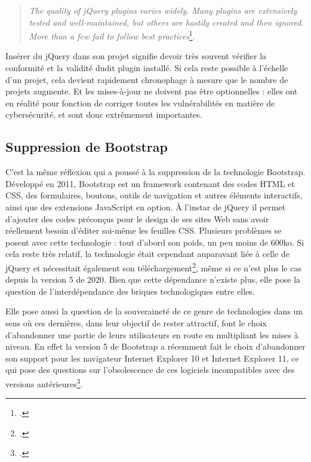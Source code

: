\documentclass[a4paper,12pt,twoside]{book}
\begin{document}
\begin{otherlanguage}{english}
\begin{quote}
    \textit{The quality of jQuery plugins varies widely. Many plugins are extensively tested and well-maintained, but others are hastily created and then ignored. More than a few fail to follow best practices}\footcite{jquery}.
\end{quote}
\end{otherlanguage}

Insérer du jQuery dans son projet signifie devoir très souvent vérifier la conformité et la validité dudit plugin installé. Si cela reste possible à l'échelle d'un projet, cela devient rapidement chronophage à mesure que le nombre de projets augmente. Et les mises-à-jour ne doivent pas être optionnelles : elles ont en réalité pour fonction de corriger toutes les vulnérabilités en matière de cybersécurité, et sont donc extrêmement importantes.

\subsection{Suppression de Bootstrap}
C'est la même réflexion qui a poussé à la suppression de la technologie Bootstrap. Développé en 2011, Bootstrap est un framework contenant des codes \acrshort{HTML} et CSS, des formulaires, boutons, outils de navigation et autres éléments interactifs, ainsi que des extensions JavaScript en option. À l'instar de jQuery il permet d'ajouter des codes préconçus pour le design de ses sites Web sans avoir réellement besoin d'éditer soi-même les feuilles CSS. Plusieurs problèmes se posent avec cette technologie : tout d'abord son poids, un peu moins de 600ko. Si cela reste très relatif, la technologie était cependant auparavant liée à celle de jQuery et nécessitait également son téléchargement\footcite{why-bootstrap}, même si ce n'est plus le cas depuis la version 5 de 2020. Bien que cette dépendance n'existe plus, elle pose la question de l'interdépendance des briques technologiques entre elles.

Elle pose aussi la question de la souveraineté de ce genre de technologies dans un sens où ces dernières, dans leur objectif de rester attractif, font le choix d'abandonner une partie de leurs utilisateurs en route en multipliant les mises à niveau. En effet la version 5 de Bootstrap a récemment fait le choix d'abandonner son support pour les navigateur Internet Explorer 10 et Internet Explorer 11, ce qui pose des questions sur l'obsolescence de ces logiciels incompatibles avec des versions antérieures\footcite{themesberg_bootstrap}.
\end{document}
